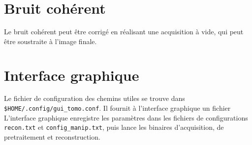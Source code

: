 \documentclass[	french,DIV=calc,%
							paper=a4,%
							fontsize=11pt,%
							twocolumn]{scrartcl}	 					%
\newcommand{\code}[1]{\texttt{#1}}
\begin{document}
\section{Bruit cohérent}
Le bruit cohérent peut être corrigé en réalisant une acquisition à vide, qui peut être soustraite à l'image finale.

\section{Interface graphique}

Le fichier de configuration des chemins utiles se trouve dans \code{\$HOME/.config/gui\_tomo.conf}. Il fournit à l'interface graphique un fichier L'interface graphique enregistre les paramètres dans les fichiers de 
configurations \code{recon.txt} et \code{config\_manip.txt}, puis lance les binaires d'acquisition, de pretraitement et reconstruction.
\end{document}
